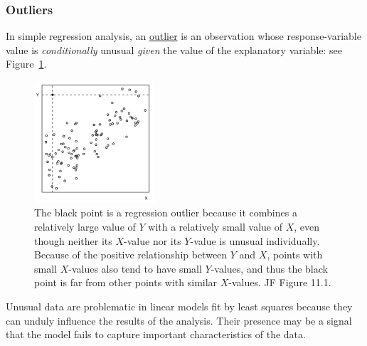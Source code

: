 \subsubsection*{Outliers}
In simple regression analysis, an \underline{outlier} is an observation whose response-variable value is {\it conditionally} unusual {\it given} the value of the explanatory variable: see Figure~\ref{fig:outlier}.
%
\begin{figure}[H]
\begin{center}
  \includegraphics[width=0.4\textwidth]{Lecture16/JF_11_1}
  \caption{The black point is a regression outlier because it combines a relatively large value of $Y$ with a relatively small value of $X$, even though neither its $X$-value nor its $Y$-value is unusual individually.
  Because of the positive relationship between $Y$ and $X$, points with small $X$-values also tend to have small $Y$-values, and thus the black point is far from other points with similar $X$-values.
   JF Figure 11.1.}
  \label{fig:outlier}
\end{center}
\end{figure}
%

Unusual data are problematic in linear models fit by least squares because they can unduly influence the results of the analysis.
Their presence may be a signal that the model fails to capture important characteristics of the data.

